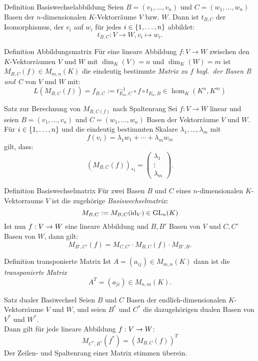 \documentclass[main.tex]{subfiles}
\begin{document}
\begin{karte}{Definition Basiswechselabbildung}
    Seien \(B = (v_1, \ldots , v_n)\) und \(C = (w_1, \ldots , w_n)\)
    Basen der \(n\)-dimensionalen \(K\)-Vektorräume \(V\) bzw. \(W\).
    Dann ist \(t_{B,C}\) der Isomorphismus, der \(v_i\) auf \(w_i\) für 
    jedes \(i \in \{1, \ldots,n\}\) abbildet: 
    \[ t_{B,C}: V \rightarrow W, v_i \mapsto w_i. \]
\end{karte}
\begin{karte}{Definition Abbildungsmatrix}
    Für eine lineare Abbildung \(f:V \rightarrow W\) zwischen den
    \(K\)-Vektorräumen \(V\) und \(W\) mit \(\dim_K(V) = n\) und 
    \(\dim_K(W) = m\) ist \(M_{B,C}(f) \in M_{m,n}(K)\) die 
    eindeutig bestimmte \textit{Matrix zu \(f\) bzgl.\ der Basen 
    B und C} von \(V\) und \(W\) mit: 
    \[ L(M_{B,C}(f)) = f_{B,C} := t_{E_m,C}^{-1} \circ f \circ t_{E_n,B} 
    \in \hom_K(K^n,K^m)\] 
\end{karte}
\begin{karte}{Satz zur Berechnung von \(M_{B,C(f)}\) nach Spaltenrang}
    Sei \(f: V \rightarrow W\) linear und seien \(B = (v_1, \ldots ,v_n)\)
    und \(C = (w_1, \ldots , w_n)\) Basen der Vektorräume \(V\) und \(W\).
    Für \(i \in \{1,\ldots,n\}\) und die eindeutig bestimmten Skalare
    \(\lambda_1,\ldots,\lambda_m\) mit
    \[f(v_i) = \lambda_1w_1 + \cdots + \lambda_m w_m\]
    gilt, dass: 
    \[{(M_{B,C}(f))}_{*i} = 
    \begin{pmatrix}
        \lambda_1 \\
        \vdots \\
        \lambda_m
    \end{pmatrix}.\]
\end{karte}
\begin{karte}{Definition Basiswechselmatrix}
    Für zwei Basen \(B\) und \(C\) eines \(n\)-dimensionalen 
    \(K\)-Vektorraums \(V\) ist die zugehörige 
    \textit{Basiswechselmatrix}:
    \[M_{B,C} := M_{B,C}(\operatorname{id}_V) \in \operatorname{GL}_n(K) \]
    Ist nun \( f : V \rightarrow W \) eine lineare Abbildung und 
    \(B,B'\) Basen von \(V\) und \(C,C'\) Basen von \(W\), dann gilt:
    \[ M_{B',C'}(f) = M_{C,C'} \cdot M_{B,C}(f) \cdot M_{B',B}. \]
\end{karte}
\begin{karte}{Definition transponierte Matrix}
    Ist \(A = (a_{ij}) \in M_{m,n}(K)\) dann ist die \textit{transponierte Matrix}
    \[ A^T  = (a_{ji}) \in M_{n,m}(K). \]
\end{karte}
\begin{karte}{Satz dualer Basiwechsel}
    Seien \(B\) und \(C\) Basen der endlich-dimensionalen 
    \(K\)-Vektorräume \(V\) und \(W\), und seien \(B^*\) und \(C^*\)
    die dazugehörigen dualen Basen von \(V^*\) und \(W^*\).\\
    Dann gilt für jede lineare Abbildung \( f : V \rightarrow W \):
    \[M_{C^*,B^*}(f^*) = {(M_{B,C}(f))}^T\]
    Der Zeilen- und Spaltenrang einer Matrix stimmen überein.
\end{karte}
\end{document}
